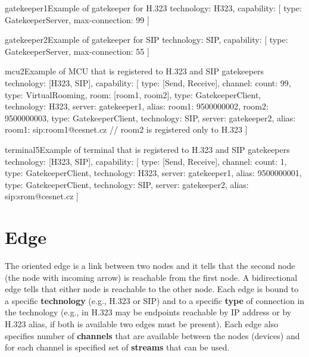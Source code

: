 \documentclass[a4paper]{report}
\begin{document}
\begin{itemize}
\begin{TopologyExample}{gatekeeper1}{Example of gatekeeper for H.323}
technology: H323,
capability: [
  {type: GatekeeperServer, max-connection: 99}
]
\end{TopologyExample}

\begin{TopologyExample}{gatekeeper2}{Example of gatekeeper for SIP}
technology: SIP,
capability: [
  {type: GatekeeperServer, max-connection: 55}
]
\end{TopologyExample}

\begin{TopologyExample}{mcu2}{Example of MCU that is registered to H.323 and SIP gatekeepers}
technology: [H323, SIP],
capability: [
  {type: [Send, Receive], channel: {count: 99}},
  {type: VirtualRooming, room: [room1, room2]},
  {type: GatekeeperClient, technology: H323, server: gatekeeper1,
     alias: {room1: 9500000002, room2: 9500000003}},
  {type: GatekeeperClient, technology: SIP, server: gatekeeper2,
     alias: {room1: sip:room1@cesnet.cz}} // room2 is registered only to H.323
]
\end{TopologyExample}

\begin{TopologyExample}{terminal5}{Example of terminal that is registered to H.323 and SIP gatekeepers}
technology: [H323, SIP],
capability: [
  {type: [Send, Receive], channel: {count: 1}},
  {type: GatekeeperClient, technology: H323, server: gatekeeper1,
     alias: 9500000001},
  {type: GatekeeperClient, technology: SIP, server: gatekeeper2,
     alias: sip:srom@cesnet.cz}
]
\end{TopologyExample}

\end{itemize}
 

\section{Edge}

The oriented edge is a link between two nodes and it tells that the second node (the node with incoming arrow) is reachable from the first node. A bidirectional edge tells that either node is reachable to the other node. Each edge is bound to a specific \textbf{technology} (e.g., H.323 or SIP) and to a specific \textbf{type} of connection in the technology (e.g., in H.323 may be endpoints reachable by IP address or by H.323 alias, if both is available two edges must be present). Each edge also specifies number of \textbf{channels} that are available between the nodes (devices) and for each channel is specified set of \textbf{streams} that can be used.
\end{document}
